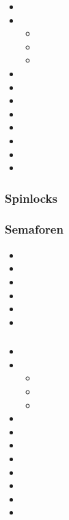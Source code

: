 \begin{itemize}
    \item 
    \item 
        \begin{itemize}
        \item 
        \item 
        \item 
        \end{itemize}
    \item 
    \item 
    \item 
    \item 
    \item 
    \item 
    \item 
    \item 
\end{itemize}

\subsubsection{Spinlocks}

\subsubsection{Semaforen}

\begin{itemize}
\item 
\item 
\item 
\item 
\item 
\item 
\end{itemize}

\subsubsection{}

\begin{itemize}
    \item 
    \item 
        \begin{itemize}
        \item 
        \item 
        \item 
        \end{itemize}
    \item 
    \item 
    \item 
    \item 
    \item 
    \item 
    \item 
    \item 
\end{itemize}

